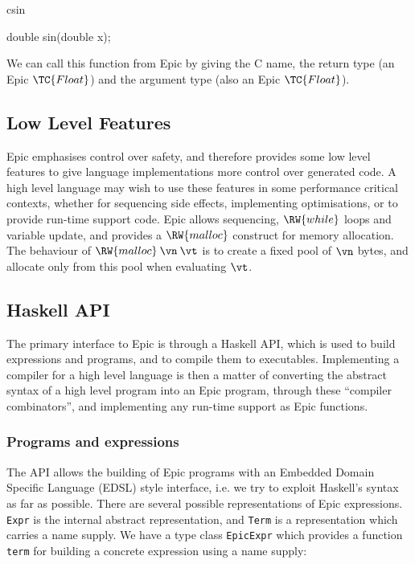 \begin{SaveVerbatim}{csin}

double sin(double x);

\end{SaveVerbatim}

\noindent
We can call this function from Epic by giving the C name, the return
type (an Epic $\TC{Float}$) and the argument type (also an Epic
$\TC{Float}$).


\subsection{Low Level Features}

Epic emphasises control over safety, and therefore provides some low
level features to give language implementations more control over
generated code.  A high level language may wish to use these features
in some performance critical contexts, whether for sequencing side
effects, implementing optimisations, or to provide run-time support
code. 
Epic allows sequencing, $\RW{while}$ loops and variable update, and
provides a $\RW{malloc}$ construct for memory allocation. The
behaviour of $\RW{malloc}\:\vn\:\vt$ is to create a fixed pool of
$\vn$ bytes, and allocate only from this pool when evaluating
$\vt$. 

\subsection{Haskell API}

The primary interface to Epic is through a Haskell API, which is used
to build expressions and programs, and to compile them to executables.
Implementing a compiler for a high level language is then a matter of
converting the abstract syntax of a high level program into an Epic
program, through these ``compiler combinators'', and implementing any
run-time support as Epic functions.

\subsubsection*{Programs and expressions}

The API allows the building of Epic programs with an Embedded Domain
Specific Language (EDSL) style interface, i.e. we try to exploit
Haskell's syntax as far as possible. There are several
possible representations of Epic expressions.
\texttt{Expr} is the internal abstract representation, and
\texttt{Term} is a representation which carries a name supply. We have
a type class \texttt{EpicExpr} which provides a function \texttt{term}
for building a concrete expression using a name supply:

